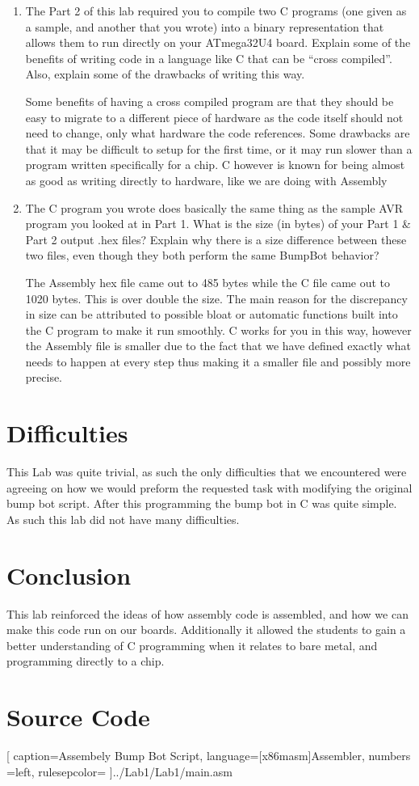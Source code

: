 \documentclass[12pt,letterpaper]{article}
\begin{document}
\begin{enumerate}
	\item 
	The Part 2 of this lab required you to compile two C programs (one given as a sample, and another that you wrote) into a binary representation that allows them to run directly on your ATmega32U4 board. Explain some of the benefits of writing code in a language like C that can be “cross compiled”. Also, explain some of the drawbacks of writing this way.
	
	Some benefits of having a cross compiled program are that they should be easy to migrate to a different piece of hardware as the code itself should not need to change, only what hardware the code references. Some drawbacks are that it may be difficult to setup for the first time, or it may run slower than a program written specifically for a chip. C however is known for being almost as good as writing directly to hardware, like we are doing with Assembly 
	
	\item 
	The C program you wrote does basically the same thing as the sample AVR	program you looked at in Part 1. What is the size (in bytes) of your Part 1 \& Part 2 output .hex files? Explain why there is a size difference between these two files, even though they both perform the same BumpBot behavior?
	
	The Assembly hex file came out to 485 bytes while the C file came out to 1020 bytes. This is over double the size. The main reason for the discrepancy in size can be attributed to possible bloat or automatic functions built into the C program to make it run smoothly. C works for you in this way, however the Assembly file is smaller due to the fact that we have defined exactly what needs to happen at every step thus making it a smaller file and possibly more precise.
	

\end{enumerate}

\section{Difficulties}
This Lab was quite trivial, as such the only difficulties that we encountered were agreeing on how we would preform the requested task with modifying the original bump bot script. After this programming the bump bot in C was quite simple. As such this lab did not have many difficulties.

\section{Conclusion}
This lab reinforced the ideas of how assembly code is assembled, and how we can make this code run on our boards. Additionally it allowed the students to gain a better understanding of C programming when it relates to bare metal, and programming directly to a chip. 

\section{Source Code}%

[
caption=Assembely Bump Bot Script,
language={[x86masm]Assembler},
numbers =left,
rulesepcolor=\color{blue}
]{../Lab1/Lab1/main.asm}

\end{document}
